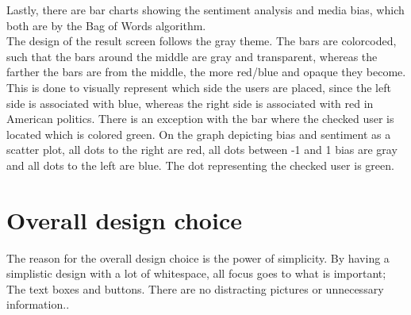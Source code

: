 
Lastly, there are bar charts showing the sentiment analysis and media bias,
which both are by the Bag of Words algorithm. \\

The design of the result screen follows the gray theme. The bars are colorcoded,
such that the bars around the middle are gray and transparent, whereas the
farther the bars are from the middle, the more red/blue and opaque they become.
This is done to visually represent which side the users are placed, since the
left side is associated with blue, whereas the right side is associated with red
in American politics. There is an exception with the bar where the checked user
is located which is colored green. On the graph depicting bias and sentiment as a
scatter plot, all dots to the right are red, all dots between -1 and 1 bias are
gray and all dots to the left are blue. The dot representing the checked user is
green.

\section{Overall design choice}
The reason for the overall design choice is the power of simplicity. By having a
simplistic design with a lot of whitespace, all focus goes to what is
important; The text boxes and buttons. There are no distracting
pictures or unnecessary information.\citep[p. 26 \& 32]{WebUI}.\\
